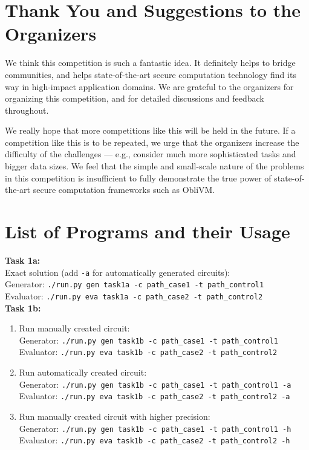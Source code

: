 \documentclass[11pt]{article}
\begin{document}
\section{Thank You and Suggestions to the Organizers}
We think this competition is such a fantastic idea. 
It definitely helps to bridge communities, and helps 
state-of-the-art secure computation technology  
find its way in high-impact application domains.
We are grateful to the organizers for organizing this competition,
and for detailed discussions and feedback 
throughout.

We really hope that more competitions like this will be held in the future.
If a competition like this is to be repeated, we 
urge that the organizers increase the difficulty 
of the challenges --- e.g., consider much more sophisticated tasks
and bigger data sizes. 
We feel that the simple and small-scale nature of the problems  
in this competition is insufficient to fully demonstrate the true power
of state-of-the-art secure computation frameworks such as {\sf ObliVM}.

\section{List of Programs and their Usage}
\noindent\textbf{Task 1a:}\\

\noindent Exact solution (add {\tt -a} for automatically generated circuits):\\
Generator: {\tt ./run.py gen task1a -c path\_case1 -t path\_control1}\\
Evaluator: {\tt ./run.py eva task1a -c path\_case2 -t path\_control2}\\

\noindent\textbf{Task 1b:}\\
\begin{enumerate}
\item Run manually created circuit:\\
Generator: {\tt ./run.py gen task1b -c path\_case1 -t path\_control1}\\
Evaluator: {\tt ./run.py eva task1b -c path\_case2 -t path\_control2}

\item Run automatically created circuit:\\
Generator: {\tt ./run.py gen task1b -c path\_case1 -t path\_control1 -a}\\
Evaluator: {\tt ./run.py eva task1b -c path\_case2 -t path\_control2 -a}

\item Run manually created circuit with higher precision:\\
Generator: {\tt ./run.py gen task1b -c path\_case1 -t path\_control1 -h}\\
Evaluator: {\tt ./run.py eva task1b -c path\_case2 -t path\_control2 -h}

\end{enumerate}
\end{document}
